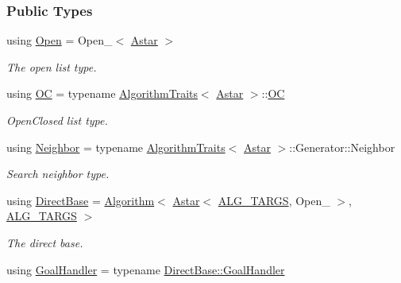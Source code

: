 \subsubsection*{Public Types}
\begin{DoxyCompactItemize}
\item 
using \hyperlink{structAstar_aff057da86de2a0b4bdf09f8bc9e01668}{Open} = Open\+\_\+$<$ \hyperlink{structAstar}{Astar} $>$\hypertarget{structAstar_aff057da86de2a0b4bdf09f8bc9e01668}{}\label{structAstar_aff057da86de2a0b4bdf09f8bc9e01668}

\begin{DoxyCompactList}\small\item\em The open list type. \end{DoxyCompactList}\item 
using \hyperlink{structAstar_ad95c7f756780188272cd6e3c11e126de}{OC} = typename \hyperlink{classAlgorithmTraits}{Algorithm\+Traits}$<$ \hyperlink{structAstar}{Astar} $>$\+::\hyperlink{structAstar_ad95c7f756780188272cd6e3c11e126de}{OC}\hypertarget{structAstar_ad95c7f756780188272cd6e3c11e126de}{}\label{structAstar_ad95c7f756780188272cd6e3c11e126de}

\begin{DoxyCompactList}\small\item\em Open\+Closed list type. \end{DoxyCompactList}\item 
using \hyperlink{structAstar_a9e1e8b116e384bc29d1cd5da0f6ace68}{Neighbor} = typename \hyperlink{classAlgorithmTraits}{Algorithm\+Traits}$<$ \hyperlink{structAstar}{Astar} $>$\+::Generator\+::\+Neighbor\hypertarget{structAstar_a9e1e8b116e384bc29d1cd5da0f6ace68}{}\label{structAstar_a9e1e8b116e384bc29d1cd5da0f6ace68}

\begin{DoxyCompactList}\small\item\em Search neighbor type. \end{DoxyCompactList}\item 
using \hyperlink{structAstar_aeaa7b3e88040a0d2c8c93cbaed6ff24c}{Direct\+Base} = \hyperlink{structAlgorithm}{Algorithm}$<$ \hyperlink{structAstar}{Astar}$<$ \hyperlink{algorithm_8h_a425b5a86fe8dae889a8343e14267c3c0}{A\+L\+G\+\_\+\+T\+A\+R\+GS}, Open\+\_\+ $>$, \hyperlink{algorithm_8h_a425b5a86fe8dae889a8343e14267c3c0}{A\+L\+G\+\_\+\+T\+A\+R\+GS} $>$\hypertarget{structAstar_aeaa7b3e88040a0d2c8c93cbaed6ff24c}{}\label{structAstar_aeaa7b3e88040a0d2c8c93cbaed6ff24c}

\begin{DoxyCompactList}\small\item\em The direct base. \end{DoxyCompactList}\item 
using \hyperlink{structAstar_a8cba9d9dc25ba8b183d8a9c4ed01f0c2}{Goal\+Handler} = typename \hyperlink{structAlgorithm_a915f86cad5585ba0adb63d017c7afdb2}{Direct\+Base\+::\+Goal\+Handler}\hypertarget{structAstar_a8cba9d9dc25ba8b183d8a9c4ed01f0c2}{}\label{structAstar_a8cba9d9dc25ba8b183d8a9c4ed01f0c2}


\end{DoxyCompactItemize}
